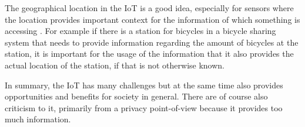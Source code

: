 The geographical location in the IoT is a good idea, especially for sensors where the location provides important context for the information of which something is accessing \citep{misc:locationMatters}.
For example if there is a station for bicycles in a bicycle sharing system that needs to provide information regarding the amount of bicycles at the station, it is important for the usage of the information that it also provides the actual location of the station, if that is not otherwise known.

In summary, the IoT has many challenges but at the same time also provides opportunities and benefits for society in general.
There are of course also criticism to it, primarily from a privacy point-of-view because it provides too much information.